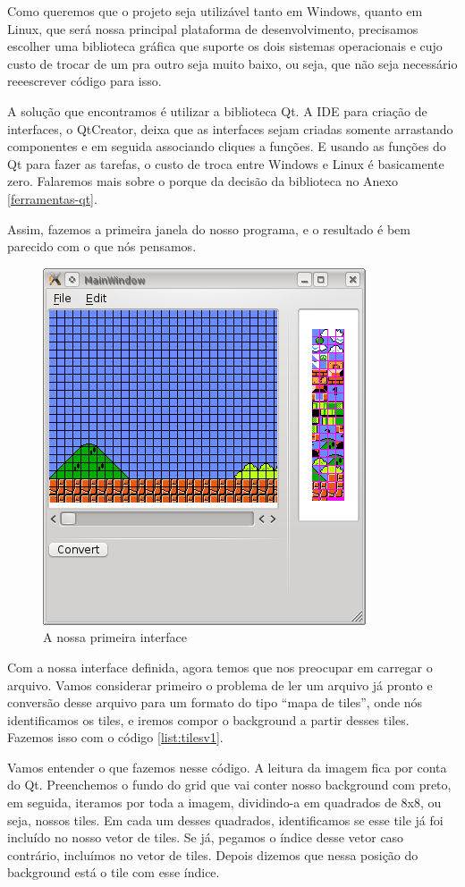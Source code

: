 \documentclass[brazil]{abnt}
\begin{document}
Como queremos que o projeto seja utilizável tanto em Windows, quanto em Linux, que será nossa principal plataforma de desenvolvimento, precisamos escolher uma biblioteca gráfica que suporte os dois sistemas operacionais e cujo custo de trocar de um pra outro seja muito baixo, ou seja, que não seja necessário reeescrever código para isso.

A solução que encontramos é utilizar a biblioteca Qt. A IDE para criação de interfaces, o QtCreator, deixa que as interfaces sejam criadas somente arrastando componentes e em seguida associando cliques a funções. E usando as funções do Qt para fazer as tarefas, o custo de troca entre Windows e Linux é basicamente zero. Falaremos mais sobre o porque da decisão da biblioteca no Anexo \ref{ferramentas-qt}.

Assim, fazemos a primeira janela do nosso programa, e o resultado é bem parecido com o que nós pensamos.

\begin{figure}[h!]
\centering
\includegraphics{imgs/mainwindow_1.png}
\caption{A nossa primeira interface} 
\end{figure}

Com a nossa interface definida, agora temos que nos preocupar em carregar o arquivo. Vamos considerar primeiro o problema de ler um arquivo já pronto e conversão desse arquivo para um formato do tipo ``mapa de tiles'', onde nós identificamos os tiles, e iremos compor o background a partir desses tiles. Fazemos isso com o código \ref{list:tilesv1}.

Vamos entender o que fazemos nesse código. A leitura da imagem fica por conta do Qt. Preenchemos o fundo do grid que vai conter nosso background com preto, em seguida, iteramos por toda a imagem, dividindo-a em quadrados de 8x8, ou seja, nossos tiles. Em cada um desses quadrados, identificamos se esse tile já foi incluído no nosso vetor de tiles. Se já, pegamos o índice desse vetor caso contrário, incluímos no vetor de tiles. Depois dizemos que nessa posição do background está o tile com esse índice. 
\end{document}
